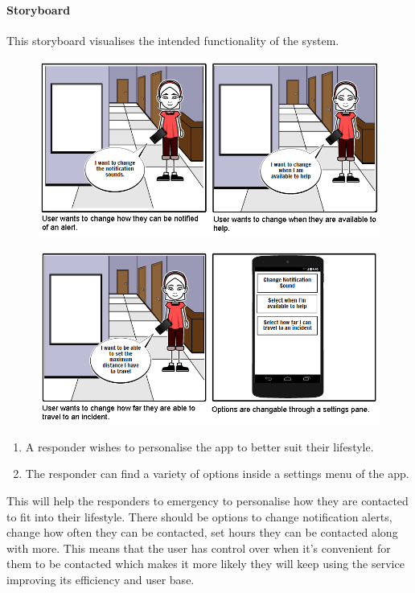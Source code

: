 \documentclass{article}
\begin{document}
		\paragraph{Storyboard}
		This storyboard visualises the intended functionality of the system.
	\begin{figure}[H]
		\centering
		\includegraphics[width=1\textwidth]{"Iteration5/Storyboard - Iteration 5 - 1"}
	\end{figure}
	\begin{figure}[H]
		\centering
		\includegraphics[width=1\textwidth]{"Iteration5/Storyboard - Iteration 5 - 2"}
		\vspace{10pt}
	\end{figure}
	\begin{enumerate}
  		\item A responder wishes to personalise the app to better suit their lifestyle.
  		\item The responder can find a variety of options inside a settings menu of the app.

	\end{enumerate}
	This will help the responders to emergency to personalise how they are contacted to fit into their lifestyle. There should be options to change notification alerts, change how often they can be contacted, set hours they can be contacted along with more. This means that the user has control over when it's convenient for them to be contacted which makes it more likely they will keep using the service improving its efficiency and user base.\\
\end{document}
